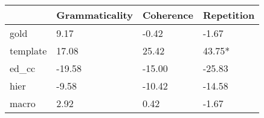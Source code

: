 \begin{tabular}{llll}
\toprule
 & Grammaticality & Coherence & Repetition \\
\midrule
gold & 9.17 & -0.42 & -1.67 \\
template & 17.08 & 25.42 & 43.75* \\
ed_cc & -19.58 & -15.00 & -25.83 \\
hier & -9.58 & -10.42 & -14.58 \\
macro & 2.92 & 0.42 & -1.67 \\
\bottomrule
\end{tabular}
